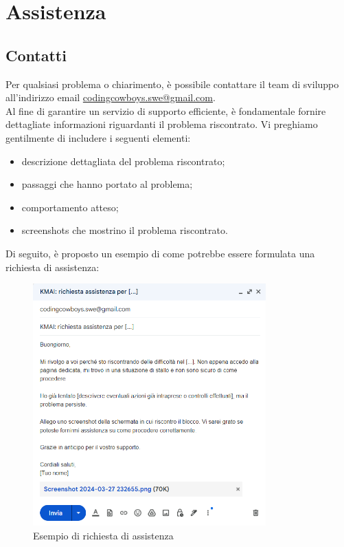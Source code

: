 \chapter{Assistenza} \label{cap:assistenza}

\section{Contatti}
Per qualsiasi problema o chiarimento, è possibile contattare il team di sviluppo all'indirizzo email \href{mailto:codingcowboys.swe@gmail.com}{codingcowboys.swe@gmail.com}. \\
Al fine di garantire un servizio di supporto efficiente, è fondamentale fornire dettagliate informazioni riguardanti il problema riscontrato. Vi preghiamo gentilmente di includere i seguenti elementi:
    \begin{itemize}
        \item descrizione dettagliata del problema riscontrato;
        \item passaggi che hanno portato al problema;
        \item comportamento atteso;
        \item screenshots che mostrino il problema riscontrato.
    \end{itemize}

\noindent Di seguito, è proposto un esempio di come potrebbe essere formulata una richiesta di assistenza:
\begin{figure}[h!]
    \centering
    \includegraphics[width=0.8\textwidth]{mailEsempio.png}
    \caption{Esempio di richiesta di assistenza}\label{fig:esempio_richiesta_assistenza}
\end{figure}